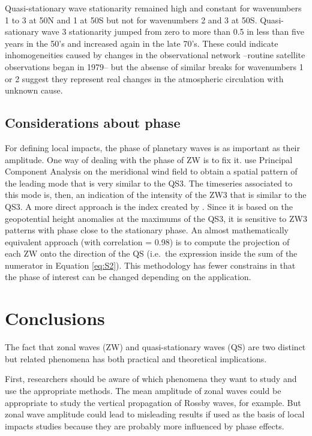 \documentclass[draft,linenumbers]{agujournal2018}
\begin{document}
Quasi-stationary wave stationarity remained high and constant for
wavenumbers 1 to 3 at 50\degree N and 1 at 50\degree S but not for
wavenumbers 2 and 3 at 50\degree S. Quasi-sationary wave 3 stationarity
jumped from zero to more than 0.5 in less than five years in the 50's
and increased again in the late 70's. These could indicate
inhomogeneities caused by changes in the observational network --routine
satellite observations began in 1979-- but the absense of similar breaks
for wavenumbers 1 or 2 suggest they represent real changes in the
atmospheric circulation with unknown cause.

\subsection{Considerations about phase}

\label{sec:phase}

For defining local impacts, the phase of planetary waves is as important
as their amplitude. One way of dealing with the phase of ZW is to fix
it. \citet{Yuan2008} use Principal Component Analysis on the meridional
wind field to obtain a spatial pattern of the leading mode that is very
similar to the QS3. The timeseries associated to this mode is, then, an
indication of the intensity of the ZW3 that is similar to the QS3. A
more direct approach is the index created by \citet{Raphael2004}. Since
it is based on the geopotential height anomalies at the maximums of the
QS3, it is sensitive to ZW3 patterns with phase close to the stationary
phase. An almost mathematically equivalent approach (with correlation =
0.98) is to compute the projection of each \(\mathrm{ZW}\) onto the
direction of the \(\mathrm{QS}\) (i.e.~the expression inside the sum of
the numerator in Equation \ref{eq:S2}). This methodology has fewer
constrains in that the phase of interest can be changed depending on the
application.

\section{Conclusions}

The fact that zonal waves (ZW) and quasi-stationary waves (QS) are two
distinct but related phenomena has both practical and theoretical
implications.

First, researchers should be aware of which phenomena they want to study
and use the appropriate methods. The mean amplitude of zonal waves could
be appropriate to study the vertical propagation of Rossby waves, for
example. But zonal wave amplitude could lead to misleading results if
used as the basis of local impacts studies because they are probably
more influenced by phase effects.
\end{document}
